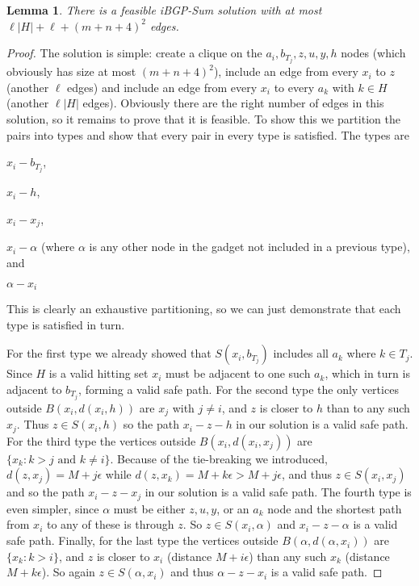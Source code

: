 \documentclass[11pt,letterpaper]{article}
\newtheorem{lemma}[theorem]{Lemma}
\theoremstyle{definition}
\begin{document}
\begin{lemma} \label{lem:ibgp-sum-sufficient}
  There is a feasible {\sc iBGP-Sum} solution with at most $\ell |H| +
  \ell + (m+n+4)^2$ edges.
\end{lemma}
\begin{proof}
  The solution is simple: create a clique on the $a_i, b_{T_j},z,u,y,h$
  nodes (which obviously has size at most $(m+n+4)^2$), include an
  edge from every $x_i$ to $z$ (another $\ell$ edges) and include an
  edge from every $x_i$ to every $a_k$ with $k \in H$ (another $\ell
  |H|$ edges).  Obviously there are the right number of edges in this
  solution, so it remains to prove that it is feasible.  To show this
  we partition the pairs into types and show that every pair in every
  type is satisfied.  The types are
  \begin{inparaenum}[\itshape 1\upshape)]
  \item $x_i - b_{T_j}$,
  \item $x_i - h$,
  \item $x_i - x_j$,
  \item $x_i - \alpha$ (where $\alpha$ is any other node in the gadget
    not included in a previous type), and
  \item $\alpha - x_i$
  \end{inparaenum}
  This is clearly an exhaustive partitioning, so we can just
  demonstrate that each type is satisfied in turn.

  For the first type we already showed that $S(x_i, b_{T_j})$ includes
  all $a_k$ where $k \in T_j$.  Since $H$ is a valid hitting set $x_i$
  must be adjacent to one such $a_k$, which in turn is adjacent to
  $b_{T_j}$, forming a valid safe path.  For the second type the only
  vertices outside $B(x_i, d(x_i,h))$ are $x_j$ with $j \neq i$, and
  $z$ is closer to $h$ than to any such $x_j$.  Thus $z \in S(x_i, h)$
  so the path $x_i - z - h$ in our solution is a valid safe path.  For
  the third type the vertices outside $B(x_i, d(x_i, x_j))$ are $\{x_k
  : k > j \text{ and } k \neq i\}$.  Because of the tie-breaking we
  introduced, $d(z, x_j) = M + j\epsilon$ while $d(z, x_k) = M + k
  \epsilon > M + j\epsilon$, and thus $z \in S(x_i, x_j)$ and so the
  path $x_i - z - x_j$ in our solution is a valid safe path.  The
  fourth type is even simpler, since $\alpha$ must be either $z,u,y$,
  or an $a_k$ node and the shortest path from $x_i$ to any of these is
  through $z$.  So $z \in S(x_i, \alpha)$ and $x_i - z - \alpha$ is a
  valid safe path.  Finally, for the last type the vertices outside
  $B(\alpha, d(\alpha, x_i))$ are $\{x_k : k > i\}$, and $z$ is closer
  to $x_i$ (distance $M + i\epsilon$) than any such $x_k$ (distance
  $M+k\epsilon$).  So again $z \in S(\alpha, x_i)$ and thus $\alpha -
  z - x_i$ is a valid safe path.
\end{proof}
\end{document}
